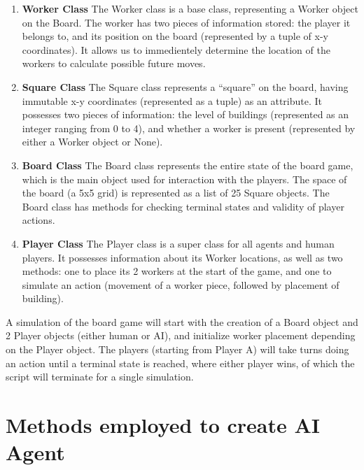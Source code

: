 \documentclass[a4paper,12pt,table]{article}
\begin{document}
\begin{enumerate}
    
    \item \textbf{Worker Class}
    \newline
    The Worker class is a base class, representing a Worker object on the Board. The worker has two pieces of information stored: the player it belongs to, and its position on the board (represented by a tuple of x-y coordinates). It allows us to immedientely determine the location of the workers to calculate possible future moves.
    
    \item \textbf{Square Class}
    \newline
    The Square class represents a “square” on the board, having immutable x-y coordinates (represented as a tuple) as an attribute. It possesses two pieces of information: the level of buildings (represented as an integer ranging from 0 to 4), and whether a worker is present (represented by either a Worker object or None).
    
    \item \textbf{Board Class}
    \newline
    The Board class represents the entire state of the board game, which is the main object used for interaction with the players. The space of the board (a 5x5 grid) is represented as a list of 25 Square objects. The Board class has methods for checking terminal states and validity of player actions.
    
    \item \textbf{Player Class}
    \newline
    The Player class is a super class for all agents and human players. It possesses information about its Worker locations, as well as two methods: one to place its 2 workers at the start of the game, and one to simulate an action (movement of a worker piece, followed by placement of building). \par

\end{enumerate}
A simulation of the board game will start with the creation of a Board object and 2 Player objects (either human or AI), and initialize worker placement depending on the Player object. The players (starting from Player A) will take turns doing an action until a terminal state is reached, where either player wins, of which the script will terminate for a single simulation. \par

\section{Methods employed to create AI Agent}
\end{document}
